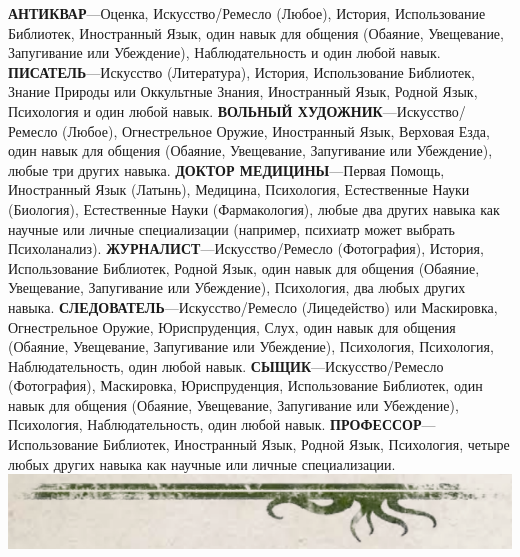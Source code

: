 \documentclass[letterpaper,twocolumn,openany, twoside, 11pt, usenames]{cocbook}
\begin{document}
\begin{cocpaperbox}{}{}
  \textbf{АНТИКВАР}---Оценка, Искусство/Ремесло (Любое), История, Использование Библиотек, Иностранный Язык, один навык для общения (Обаяние, Увещевание, Запугивание или Убеждение), Наблюдательность и один любой навык.
  \bigbreak
  \textbf{ПИСАТЕЛЬ}---Искусство (Литература), История, Использование Библиотек, Знание Природы или Оккультные Знания, Иностранный Язык, Родной Язык, Психология и один любой навык.
  \bigbreak
  \textbf{ВОЛЬНЫЙ ХУДОЖНИК}---Искусство/Ремесло (Любое), Огнестрельное Оружие, Иностранный Язык, Верховая Езда, один навык для общения (Обаяние, Увещевание, Запугивание или Убеждение), любые три других навыка.
  \bigbreak
  \textbf{ДОКТОР МЕДИЦИНЫ}---Первая Помощь, Иностранный Язык (Латынь), Медицина, Психология, Естественные Науки (Биология), Естественные Науки (Фармакология), любые два других навыка как научные или личные специализации (например, психиатр может выбрать Психоланализ).
  \bigbreak
  \textbf{ЖУРНАЛИСТ}---Искусство/Ремесло (Фотография), История, Использование Библиотек, Родной Язык, один навык для общения (Обаяние, Увещевание, Запугивание или Убеждение), Психология, два любых других навыка.
  \bigbreak
  \textbf{СЛЕДОВАТЕЛЬ}---Искусство/Ремесло (Лицедейство) или Маскировка, Огнестрельное Оружие, Юриспруденция, Слух, один навык для общения (Обаяние, Увещевание, Запугивание или Убеждение), Психология, Психология, Наблюдательность, один любой навык.
  \bigbreak
  \textbf{СЫЩИК}---Искусство/Ремесло (Фотография), Маскировка, Юриспруденция, Использование Библиотек, один навык для общения (Обаяние, Увещевание, Запугивание или Убеждение), Психология, Наблюдательность, один любой навык.
  \bigbreak
  \textbf{ПРОФЕССОР}---Использование Библиотек, Иностранный Язык, Родной Язык, Психология, четыре любых других навыка как научные или личные специализации.
  \includegraphics[width=\linewidth]{img/bottom.png}
\end{cocpaperbox}
\end{document}
